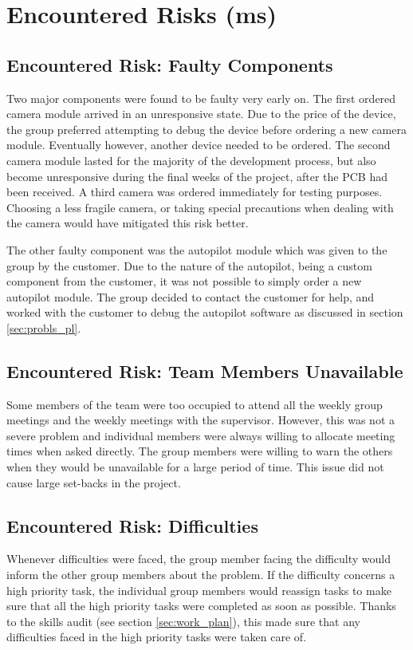 \section{Encountered Risks (ms)}
\label{encountered risks}

\subsection{Encountered Risk: Faulty Components}
Two major components were found to be faulty very early on. 
The first ordered camera module  
arrived in an unresponsive state. 
Due to the price of the device, 
the group preferred attempting to debug the device before 
ordering a new camera module. 
Eventually however, another device needed to be ordered. 
The second camera module lasted for the majority of 
the development process, but also 
become unresponsive during the final weeks of the project,
after the PCB had been received. 
A third camera was ordered immediately for testing purposes.
Choosing a less fragile camera, or taking special precautions
when dealing with the camera would have mitigated this risk better.

The other faulty component was the autopilot module which 
was given to the group by the customer. 
Due to the nature of the autopilot, being a custom component 
from the customer, it was not possible to simply 
order a new autopilot module. 
The group decided to contact the customer for help, and 
worked with the customer to debug the autopilot software 
as discussed in section \ref{sec:probls_pl}.

\subsection{Encountered Risk: Team Members Unavailable}
Some members of the team were too occupied to attend 
all the weekly group meetings and 
the weekly meetings with the supervisor. 
However, this was not a severe problem and individual 
members were always willing to allocate 
meeting times when asked directly. 
The group members were willing to warn the others 
when they would be unavailable for a large period of time. 
This issue did not cause large set-backs in the project.

\subsection{Encountered Risk: Difficulties}
Whenever difficulties were faced, the group member 
facing the difficulty would inform the other 
group members about the problem. 
If the difficulty concerns a high priority task, 
the individual group members would reassign 
tasks to make sure that all the high priority 
tasks were completed as soon as possible. 
Thanks to the skills audit (see section \ref{sec:work_plan}), this made sure that 
any difficulties faced in the high priority 
tasks were taken care of. 